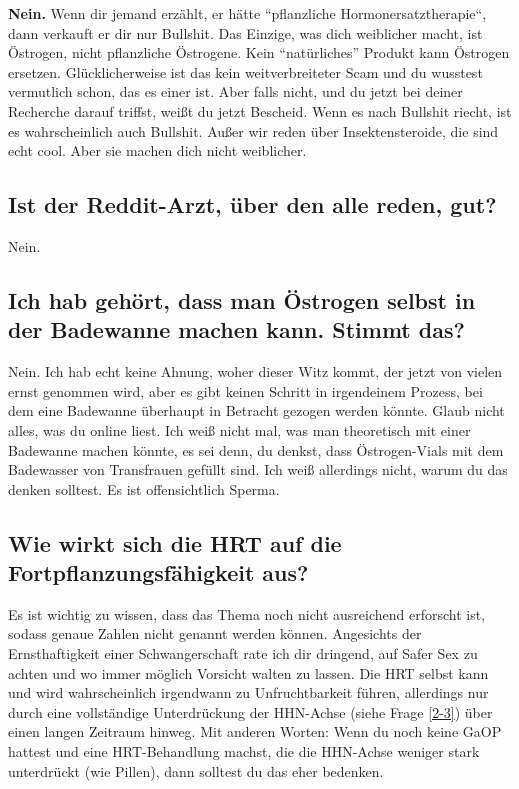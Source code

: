 \documentclass{article}
\begin{document}
\textbf{Nein.} Wenn dir jemand erzählt, er hätte “pflanzliche Hormonersatztherapie“, dann verkauft er dir nur Bullshit. Das Einzige, was dich weiblicher macht, ist Östrogen, nicht pflanzliche Östrogene. Kein “natürliches” Produkt kann Östrogen ersetzen. Glücklicherweise ist das kein weitverbreiteter Scam und du wusstest vermutlich schon, das es einer ist. Aber falls nicht, und du jetzt bei deiner Recherche darauf triffst, weißt du jetzt Bescheid. Wenn es nach Bullshit riecht, ist es wahrscheinlich auch Bullshit. Außer wir reden über Insektensteroide, die sind echt cool. Aber sie machen dich nicht weiblicher.

\subsection{Ist der Reddit-Arzt, über den alle reden, gut?}

Nein.

\subsection{Ich hab gehört, dass man Östrogen selbst in der Badewanne machen kann. Stimmt das?}

Nein. Ich hab echt keine Ahnung, woher dieser Witz kommt, der jetzt von vielen ernst genommen wird, aber es gibt keinen Schritt in irgendeinem Prozess, bei dem eine Badewanne überhaupt in Betracht gezogen werden könnte. Glaub nicht alles, was du online liest. Ich weiß nicht mal, was man theoretisch mit einer Badewanne machen könnte, es sei denn, du denkst, dass Östrogen-Vials mit dem Badewasser von Transfrauen gefüllt sind. Ich weiß allerdings nicht, warum du das denken solltest. Es ist offensichtlich Sperma.

\subsection{Wie wirkt sich die HRT auf die Fortpflanzungsfähigkeit aus?}\label{11-42}

Es ist wichtig zu wissen, dass das Thema noch nicht ausreichend erforscht ist, sodass genaue Zahlen nicht genannt werden können. Angesichts der Ernsthaftigkeit einer Schwangerschaft rate ich dir dringend, auf Safer Sex zu achten und wo immer möglich Vorsicht walten zu lassen. Die HRT selbst kann und wird wahrscheinlich irgendwann zu Unfruchtbarkeit führen, allerdings nur durch eine vollständige Unterdrückung der HHN-Achse (siehe Frage \ref{2-3}) über einen langen Zeitraum hinweg. Mit anderen Worten: Wenn du noch keine GaOP hattest und eine HRT-Behandlung machst, die die HHN-Achse weniger stark unterdrückt (wie Pillen), dann solltest du das eher bedenken.
\end{document}
